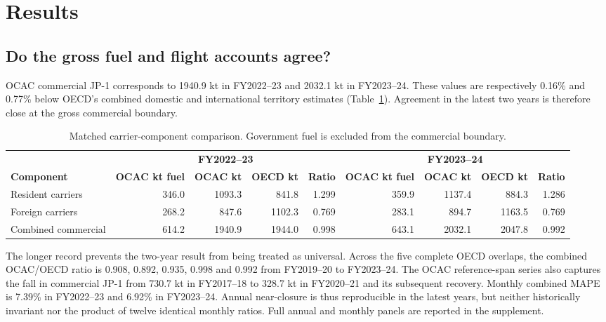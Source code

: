 \section{Results}
\label{sec:results}

\subsection{Do the gross fuel and flight accounts agree?}

OCAC commercial JP-1 corresponds to 1940.9 kt \COtwo{} in FY2022--23 and 2032.1 kt in
FY2023--24. These values are respectively 0.16\% and 0.77\% below OECD's combined domestic and
international territory estimates (Table~\ref{tab:two-year}). Agreement in the latest two
years is therefore close at the gross commercial boundary.

\begin{table}[htbp]
\centering
\footnotesize
\begin{tabular}{@{}lrrrrrrrr@{}}
\toprule
 & \multicolumn{4}{c}{\textbf{FY2022--23}} & \multicolumn{4}{c}{\textbf{FY2023--24}} \\
\cmidrule(lr){2-5}\cmidrule(lr){6-9}
\textbf{Component} & \textbf{OCAC kt fuel} & \textbf{OCAC kt \COtwo{}} & \textbf{OECD kt \COtwo{}} & \textbf{Ratio} &
\textbf{OCAC kt fuel} & \textbf{OCAC kt \COtwo{}} & \textbf{OECD kt \COtwo{}} & \textbf{Ratio} \\
\midrule
Resident carriers & 346.0 & 1093.3 & 841.8 & 1.299 & 359.9 & 1137.4 & 884.3 & 1.286 \\
Foreign carriers & 268.2 & 847.6 & 1102.3 & 0.769 & 283.1 & 894.7 & 1163.5 & 0.769 \\
Combined commercial & 614.2 & 1940.9 & 1944.0 & 0.998 & 643.1 & 2032.1 & 2047.8 & 0.992 \\
\bottomrule
\end{tabular}
\caption{Matched carrier-component comparison. Government fuel is excluded from the
commercial boundary.}
\label{tab:two-year}
\end{table}

The longer record prevents the two-year result from being treated as universal. Across the
five complete OECD overlaps, the combined OCAC/OECD ratio is 0.908, 0.892, 0.935, 0.998 and
0.992 from FY2019--20 to FY2023--24. The OCAC reference-span series also captures the fall in
commercial JP-1 from 730.7 kt in FY2017--18 to 328.7 kt in FY2020--21 and its subsequent
recovery. Monthly combined MAPE is 7.39\% in FY2022--23 and 6.92\% in FY2023--24. Annual
near-closure is thus reproducible in the latest years, but neither historically invariant nor
the product of twelve identical monthly ratios. Full annual and monthly panels are reported in
the supplement.

